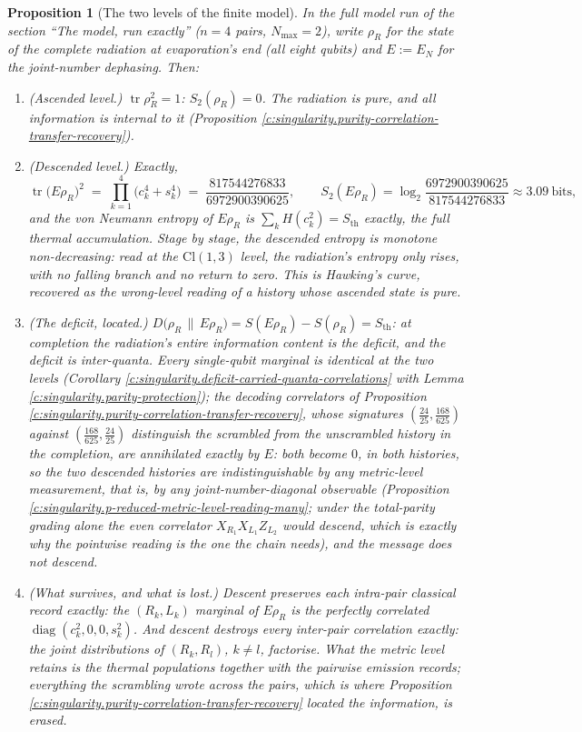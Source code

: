 \documentclass[11pt]{article}
\newtheorem{proposition}[theorem]{Proposition}
\theoremstyle{definition}
\theoremstyle{plain}
\newcommand{\changedmark}[2]{\marginpar{\raggedright\scriptsize\color{#1}#2}}
\providecommand{\Cl}{}\renewcommand{\Cl}{\mathrm{Cl}}
\providecommand{\EN}{}\renewcommand{\EN}{E_{N}}
\providecommand{\Sth}{}\renewcommand{\Sth}{S_{\mathrm{th}}}
\providecommand{\tr}{}\renewcommand{\tr}{\operatorname{tr}}
\providecommand{\rel}{}\renewcommand{\rel}[2]{D\bigl(#1 \,\|\, #2\bigr)}
\begin{document}
\begin{proposition}[The two levels of the finite model]\label{c:singularity.two-levels-finite-model}
\changedmark{gray}{reworded}
In the full model run of the section ``The model, run exactly'' ($n = 4$ pairs, $N_{\max} = 2$), write $\rho_R$ for the state of the complete radiation at evaporation's end (all eight qubits) and $E := \EN$ for the joint-number dephasing. Then:
\begin{enumerate}
\item (Ascended level.) $\tr \rho_R^2 = 1$: $S_2(\rho_R) = 0$. The radiation is pure, and all information is internal to it (Proposition \ref{c:singularity.purity-correlation-transfer-recovery}).
\item (Descended level.) Exactly,
\[
\tr\bigl(E\rho_R\bigr)^2 \;=\; \prod_{k=1}^{4}\bigl(c_k^4 + s_k^4\bigr) \;=\; \frac{817544276833}{6972900390625},
\qquad
S_2(E\rho_R) = \log_2\frac{6972900390625}{817544276833} \approx 3.09 \ \text{bits},
\]
and the von Neumann entropy of $E\rho_R$ is $\sum_k H(c_k^2) = \Sth$ exactly, the full thermal accumulation. Stage by stage, the descended entropy is monotone non-decreasing: read at the $\Cl(1,3)$ level, the radiation's entropy only rises, with no falling branch and no return to zero. This is Hawking's curve, recovered as the wrong-level reading of a history whose ascended state is pure.
\item (The deficit, located.) $\rel{\rho_R}{E\rho_R} = S(E\rho_R) - S(\rho_R) = \Sth$: at completion the radiation's entire information content is the deficit, and the deficit is inter-quanta. Every single-qubit marginal is identical at the two levels (Corollary \ref{c:singularity.deficit-carried-quanta-correlations} with Lemma \ref{c:singularity.parity-protection}); the decoding correlators of Proposition \ref{c:singularity.purity-correlation-transfer-recovery}, whose signatures $(\tfrac{24}{25}, \tfrac{168}{625})$ against $(\tfrac{168}{625}, \tfrac{24}{25})$ distinguish the scrambled from the unscrambled history in the completion, are annihilated exactly by $E$: both become $0$, in both histories, so the two descended histories are indistinguishable by any metric-level measurement, that is, by any joint-number-diagonal observable (Proposition \ref{c:singularity.p-reduced-metric-level-reading-many}; under the total-parity grading alone the even correlator $X_{R_1}X_{L_1}Z_{L_2}$ would descend, which is exactly why the pointwise reading is the one the chain needs), and the message does not descend.
\item (What survives, and what is lost.) Descent preserves each intra-pair classical record exactly: the $(R_k, L_k)$ marginal of $E\rho_R$ is the perfectly correlated $\operatorname{diag}(c_k^2, 0, 0, s_k^2)$. And descent destroys every inter-pair correlation exactly: the joint distributions of $(R_k, R_l)$, $k \neq l$, factorise. What the metric level retains is the thermal populations together with the pairwise emission records; everything the scrambling wrote \emph{across} the pairs, which is where Proposition \ref{c:singularity.purity-correlation-transfer-recovery} located the information, is erased.
\end{enumerate}
\end{proposition}
\end{document}
